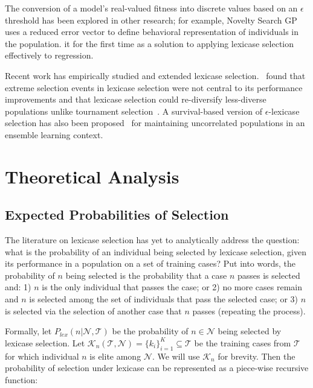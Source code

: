 \documentclass[twoside]{article}
\newcommand{\edit}[1]{{\color{red} #1}}
\begin{document}
The conversion of a model's real-valued fitness into discrete values based on an $\epsilon$ threshold has been explored in other research; for example, Novelty Search GP~\citep{martinez_searching_2013} uses a reduced error vector to define behavioral representation of individuals in the population. \cite{la_cava_epsilon-lexicase_2016} it for the first time as a solution to applying lexicase selection effectively to regression.

Recent work has empirically studied and extended lexicase selection.~\cite{helmuth_impact_2016} found that extreme selection events in lexicase selection were not central to its performance improvements and that lexicase selection could re-diversify less-diverse populations unlike tournament selection~\citep{helmuth_effects_2016}. A survival-based version of $\epsilon$-lexicase selection has also been proposed~\citep{la_cava_general_2017,la_cava_ensemble_2017} for maintaining uncorrelated populations in an ensemble learning context. 

\edit{\section{Theoretical Analysis}}
\subsection{Expected Probabilities of Selection}\label{s:prob}
The literature on lexicase selection has yet to analytically address the question: what is the probability of an individual being selected by lexicase selection, given its performance in a population on a set of training cases?  Put into words, the probability of $n$ being selected is the probability that a case $n$ passes is selected and: 1) $n$ is the only individual that passes the case; or 2) no more cases remain and $n$ is selected among the set of individuals that pass the selected case; or 3) $n$ is selected via the selection of another case that $n$ passes (repeating the process). 

Formally, let $P_{lex}(n | \mathcal{N}, \mathcal{T})$ be the probability of $n \in \mathcal{N}$ being selected by lexicase selection. Let $\mathcal{K}_n(\mathcal{T},\mathcal{N}) = \{k_i\}_{i=1}^K \subseteq \mathcal{T}$ be the training cases from $\mathcal{T}$ for which individual $n$ is elite among $\mathcal{N}$. We will use $\mathcal{K}_n$ for brevity. Then the probability of selection under lexicase can be represented as a piece-wise recursive function: 
\end{document}
